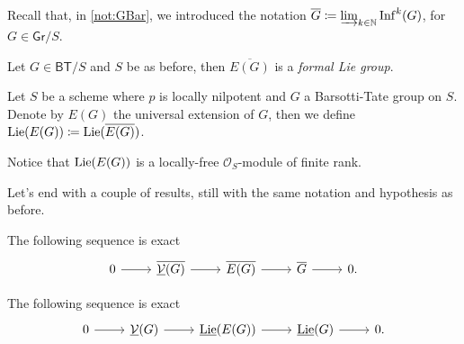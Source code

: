 \noindent
Recall that, in \cref{not:GBar}, we introduced the notation
$\overline{G} \coloneqq \varinjlim_{k \in \mathbb{N}} \mathrm{Inf}^k(G)$,
for $G \in \mathsf{Gr}/S$.


\begin{prop}\label{prop:ExtFLG}
	Let $G \in \mathsf{BT}/S$ and $S$ be as before,
	then $\overline{E(G)}$ is a \emph{formal Lie group}.
\end{prop} 


\begin{defn}[]
	Let $S$ be a scheme where $p$ is locally nilpotent and $G$
	a Barsotti-Tate group on $S$.
	Denote by $E(G)$ the universal extension of $G$, then we define
	$\operatorname{Lie}(E(G)) \coloneqq \operatorname{Lie}(\overline{E(G)})$.
\end{defn}


\begin{rem}[]
	Notice that $\operatorname{Lie}(E(G))$ is a locally-free
	$\mathcal{O}_{ S }$-module of finite rank.
\end{rem}


\noindent
Let's end with a couple of results, still with the same notation and hypothesis as before.
\begin{prop}
	The following sequence is exact
	\begin{equation*}
	\begin{tikzcd}
		0 \arrow[r, "", rightarrow] &
		\overline{\underline{\mathcal{V}}(G)} \arrow[r, "", rightarrow] &
		\overline{E(G)} \arrow[r, "", rightarrow] &
		\overline{G} \arrow[r, "", rightarrow] &
		0
	.\end{tikzcd}
	\end{equation*}
\end{prop} 


\begin{prop}\label{SESDieudonneCrystalEvaluation}
	The following sequence is exact
	\begin{equation*}
	\begin{tikzcd}
		0 \arrow[r, "", rightarrow] &
		\underline{\mathcal{V}}(G) \arrow[r, "", rightarrow] &
		\underline{\lie}(E(G)) \arrow[r, "", rightarrow] &
		\underline{\lie}(G) \arrow[r, "", rightarrow] &
		0
	.\end{tikzcd}
	\end{equation*}
\end{prop} 



